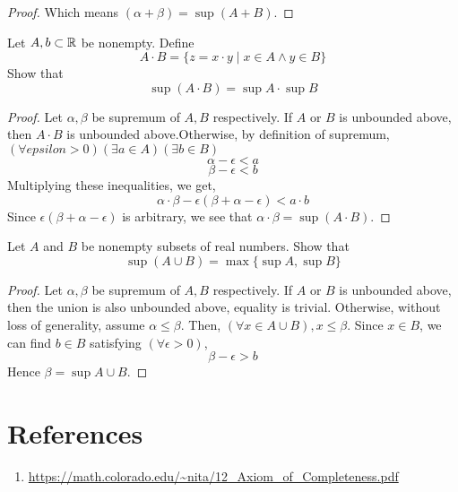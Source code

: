 \begin{problems}
\begin{proof}
        Which means $(\alpha + \beta) = \sup (A+B)$.
    \end{proof}
\item Let $A,b \subset {\mathbb{R}}$ be nonempty. Define
    \[ A \cdot B = \{ z = x \cdot y \mid x \in A \land y \in B\}\]
    Show that
    \[ \sup (A \cdot B) = \sup A \cdot \sup B\]
    \begin{proof}
        Let $\alpha, \beta$ be supremum of $A,B$ respectively. If $A$ or $B$ is unbounded above, then $A \cdot B$ is unbounded
        above.Otherwise, by definition of supremum, $(\forall epsilon > 0)(\exists a \in A)(\exists b \in B)$
        \[ \alpha - \epsilon < a\]
        \[ \beta - \epsilon < b\]
        Multiplying these inequalities, we get,
        \[ \alpha \cdot \beta - \epsilon(\beta + \alpha - \epsilon) < a \cdot b\]
        Since $\epsilon(\beta + \alpha - \epsilon)$ is arbitrary, we see that $\alpha \cdot \beta = \sup (A \cdot B)$.
    \end{proof}
\item Let $A$ and $B$ be nonempty subsets of real numbers. Show that
    \[ \sup(A \cup B) = \max \{ \sup A, \sup B\}\]
    \begin{proof}
        Let $\alpha, \beta$ be supremum of $A,B$ respectively. If $A$ or $B$ is unbounded above, then the union is also unbounded above,
        equality is trivial. Otherwise, without loss of generality, assume $\alpha \le \beta$. Then, $(\forall x \in A \cup B), x \le
        \beta$. Since $x \in B$, we can find $b \in B$ satisfying $(\forall \epsilon > 0)$,
        \[ \beta - \epsilon > b\]
        Hence $\beta = \sup A \cup B$.
    \item
    \end{proof}
\end{problems}
\section{References}
\begin{enumerate}
    \item \url{https://math.colorado.edu/~nita/12_Axiom_of_Completeness.pdf}
\end{enumerate}

